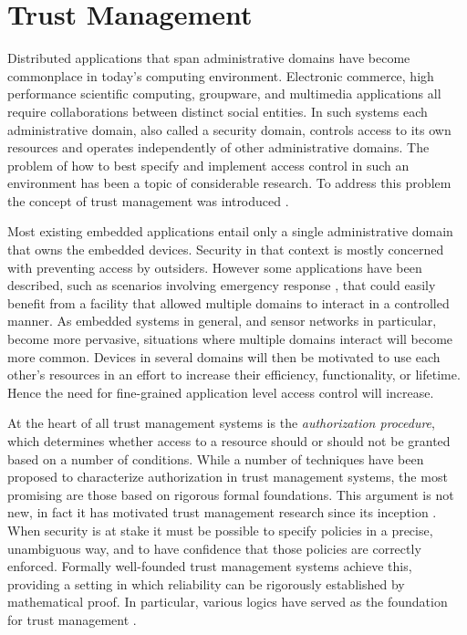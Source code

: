 
\chapter{Trust Management}
\label{chapter-trust-management}

Distributed applications that span administrative domains have become commonplace in today's
computing environment. Electronic commerce, high performance scientific computing, groupware,
and multimedia applications all require collaborations between distinct social entities. In such
systems each administrative domain, also called a security domain, controls access to its own
resources and operates independently of other administrative domains. The problem of how to best
specify and implement access control in such an environment has been a topic of considerable
research. To address this problem the concept of trust management was introduced \cite{Blaze:DTM}.

Most existing embedded applications entail only a single administrative domain that owns the
embedded devices. Security in that context is mostly concerned with preventing access by
outsiders. However some applications have been described, such as scenarios involving emergency
response \cite{1038146}, that could easily benefit from a facility that allowed multiple domains
to interact in a controlled manner. As embedded systems in general, and sensor networks in
particular, become more pervasive, situations where multiple domains interact will become more
common. Devices in several domains will then be motivated to use each other's resources in an
effort to increase their efficiency, functionality, or lifetime. Hence the need for fine-grained
application level access control will increase.

At the heart of all trust management systems is the \emph{authorization procedure}, which
determines whether access to a resource should or should not be granted based on a number of
conditions. While a number of techniques have been proposed to characterize authorization in
trust management systems, the most promising are those based on rigorous formal
foundations. This argument is not new, in fact it has motivated trust management research since
its inception \cite{woo93authorizations}. When security is at stake it must be possible to
specify policies in a precise, unambiguous way, and to have confidence that those policies are
correctly enforced. Formally well-founded trust management systems achieve this, providing a
setting in which reliability can be rigorously established by mathematical proof. In particular,
various logics have served as the foundation for trust management
\cite{Abadi:LAC,Bertino:LFRAACM}.

